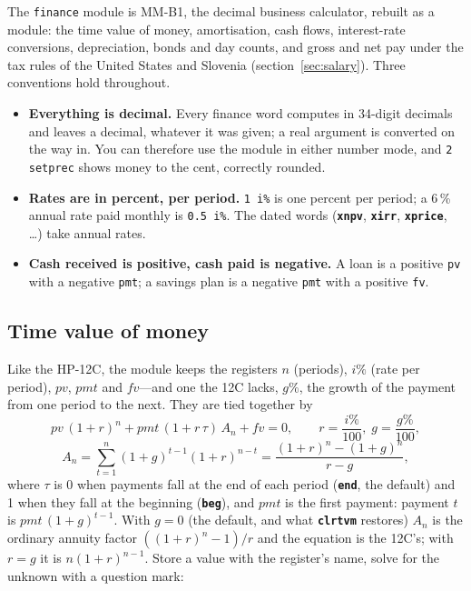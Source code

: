 \documentclass[11pt,letterpaper]{article}
\newcommand{\code}[1]{\texttt{#1}}
\newcommand{\cmd}[1]{\texttt{\textbf{#1}}}
\begin{document}
The \code{finance} module is MM-B1, the decimal business calculator, rebuilt as a module: the time value of money, amortisation, cash flows, interest-rate conversions, depreciation, bonds and day counts, and gross and net pay under the tax rules of the United States and Slovenia (section~\ref{sec:salary}). Three conventions hold throughout.
\begin{itemize}
  \item \textbf{Everything is decimal.} Every finance word computes in 34-digit decimals and leaves a decimal, whatever it was given; a real argument is converted on the way in. You can therefore use the module in either number mode, and \code{2 setprec} shows money to the cent, correctly rounded.
  \item \textbf{Rates are in percent, per period.} \code{1 i\%} is one percent per period; a 6\,\% annual rate paid monthly is \code{0.5 i\%}. The dated words (\cmd{xnpv}, \cmd{xirr}, \cmd{xprice}, \ldots) take annual rates.
  \item \textbf{Cash received is positive, cash paid is negative.} A loan is a positive \code{pv} with a negative \code{pmt}; a savings plan is a negative \code{pmt} with a positive \code{fv}.
\end{itemize}

\subsection{Time value of money}
\label{sec:tvm}

Like the HP-12C, the module keeps the registers $n$ (periods), $i\%$ (rate per period), $pv$, $pmt$ and $fv$---and one the 12C lacks, $g\%$, the growth of the payment from one period to the next. They are tied together by
\[
  pv\,(1+r)^n + pmt\,(1 + r\,\tau)\,A_n + fv = 0, \qquad r = \frac{i\%}{100},\; g = \frac{g\%}{100},
\]
\[
  A_n = \sum_{t=1}^{n} (1+g)^{t-1}(1+r)^{n-t} = \frac{(1+r)^n - (1+g)^n}{r - g},
\]
where $\tau$ is 0 when payments fall at the end of each period (\cmd{end}, the default) and 1 when they fall at the beginning (\cmd{beg}), and $pmt$ is the first payment: payment $t$ is $pmt\,(1+g)^{t-1}$. With $g = 0$ (the default, and what \cmd{clrtvm} restores) $A_n$ is the ordinary annuity factor $((1+r)^n-1)/r$ and the equation is the 12C's; with $r = g$ it is $n(1+r)^{n-1}$. Store a value with the register's name, solve for the unknown with a question mark:
\end{document}
